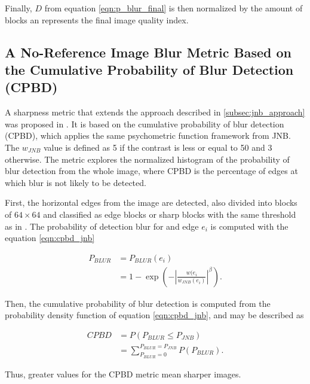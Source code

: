 \noindent Finally, $D$ from equation \ref{eqn:p_blur_final} is then normalized by the amount of blocks an represents the final image quality index.

\subsection{A No-Reference Image Blur Metric Based on the Cumulative Probability of Blur Detection (CPBD)}

A sharpness metric that extends the approach described in \ref{subsec:jnb_approach} was proposed in \cite{narvekar2011noreference}. It is based on the cumulative probability of blur detection (CPBD), which applies the same psychometric function framework from JNB. The $w_{JNB}$ value is defined as 5 if the contrast is less or equal to 50 and 3 otherwise. The metric explores the normalized histogram of the probability of blur detection from the whole image, where CPBD is the percentage of edges at which blur is not likely to be detected.

First, the horizontal edges from the image are detected, also divided into blocks of $64 \times 64$ and classified as edge blocks or sharp blocks with the same threshold as in . The probability of detection blur for and edge $e_{i}$ is computed with the equation \ref{eqn:cpbd_jnb}

\begin{equation}
\label{eqn:cpbd_jnb}
\begin{split}
    P_{BLUR} &= P_{BLUR}(e_{i})\\
    &= 1 - \exp{
    \left(
        - \left|
            \frac{w(e_{i}}{w_{JNB}(e_{i})}
        \right|^\beta
    \right)}.
\end{split}
\end{equation}

\noindent Then, the cumulative probability of blur detection is computed from the probability density function of equation \ref{eqn:cpbd_jnb}, and may be described as

\begin{equation}
\label{eqn:cpbd}
\begin{split}
    CPBD &= P(P_{BLUR} \leq P_{JNB})\\
    &=\sum_{P_{BLUR} = 0}^{P_{BLUR} = P_{JNB}}P(P_{BLUR}).
\end{split}
\end{equation}

\noindent Thus, greater values for the CPBD metric mean sharper images.


